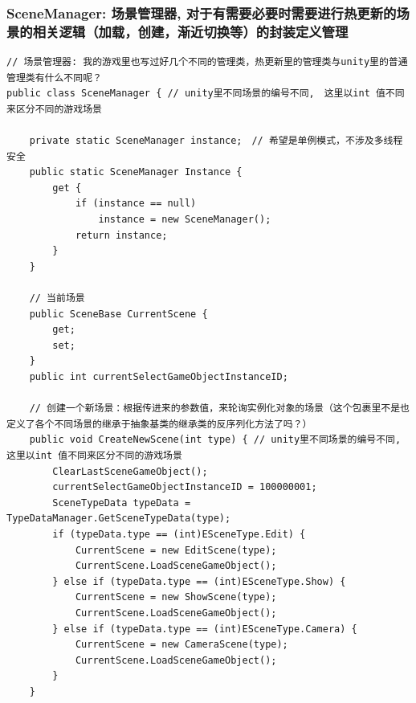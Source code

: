 \documentclass[9pt, b5paper]{article}
\begin{document}
\subsubsection{SceneManager: 场景管理器, 对于有需要必要时需要进行热更新的场景的相关逻辑（加载，创建，渐近切换等）的封装定义管理}
\label{sec-9-2-3}
\begin{verbatim}
// 场景管理器: 我的游戏里也写过好几个不同的管理类，热更新里的管理类与unity里的普通管理类有什么不同呢？
public class SceneManager { // unity里不同场景的编号不同,　这里以int 值不同来区分不同的游戏场景

    private static SceneManager instance;　// 希望是单例模式，不涉及多线程安全
    public static SceneManager Instance {
        get {
            if (instance == null) 
                instance = new SceneManager();
            return instance;
        }
    }

    // 当前场景
    public SceneBase CurrentScene {
        get;
        set;
    }
    public int currentSelectGameObjectInstanceID;

    // 创建一个新场景：根据传进来的参数值，来轮询实例化对象的场景（这个包裹里不是也定义了各个不同场景的继承于抽象基类的继承类的反序列化方法了吗？）
    public void CreateNewScene(int type) { // unity里不同场景的编号不同,　这里以int 值不同来区分不同的游戏场景
        ClearLastSceneGameObject();
        currentSelectGameObjectInstanceID = 100000001;
        SceneTypeData typeData = TypeDataManager.GetSceneTypeData(type);
        if (typeData.type == (int)ESceneType.Edit) {
            CurrentScene = new EditScene(type);
            CurrentScene.LoadSceneGameObject();
        } else if (typeData.type == (int)ESceneType.Show) {
            CurrentScene = new ShowScene(type);
            CurrentScene.LoadSceneGameObject();
        } else if (typeData.type == (int)ESceneType.Camera) {
            CurrentScene = new CameraScene(type);
            CurrentScene.LoadSceneGameObject();
        }
    }


\end{verbatim}
\end{document}
